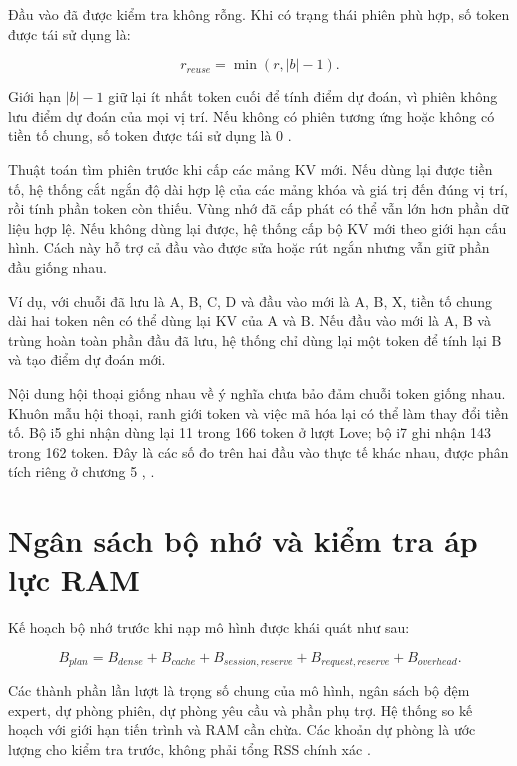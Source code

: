 Đầu vào đã được kiểm tra không rỗng. Khi có trạng thái phiên phù hợp, số token được tái sử dụng là:

\begin{equation}
\label{eq:4.2}
r_{reuse}=\min(r,|b|-1).
\end{equation}

Giới hạn $|b|-1$ giữ lại ít nhất token cuối để tính điểm dự đoán, vì phiên không lưu điểm dự đoán của mọi vị trí. Nếu không có phiên tương ứng hoặc không có tiền tố chung, số token được tái sử dụng là 0 \cite{moe_tierengine_arch}.

Thuật toán tìm phiên trước khi cấp các mảng KV mới. Nếu dùng lại được tiền tố, hệ thống cắt ngắn độ dài hợp lệ của các mảng khóa và giá trị đến đúng vị trí, rồi tính phần token còn thiếu. Vùng nhớ đã cấp phát có thể vẫn lớn hơn phần dữ liệu hợp lệ. Nếu không dùng lại được, hệ thống cấp bộ KV mới theo giới hạn cấu hình. Cách này hỗ trợ cả đầu vào được sửa hoặc rút ngắn nhưng vẫn giữ phần đầu giống nhau.

Ví dụ, với chuỗi đã lưu là A, B, C, D và đầu vào mới là A, B, X, tiền tố chung dài hai token nên có thể dùng lại KV của A và B. Nếu đầu vào mới là A, B và trùng hoàn toàn phần đầu đã lưu, hệ thống chỉ dùng lại một token để tính lại B và tạo điểm dự đoán mới.

Nội dung hội thoại giống nhau về ý nghĩa chưa bảo đảm chuỗi token giống nhau. Khuôn mẫu hội thoại, ranh giới token và việc mã hóa lại có thể làm thay đổi tiền tố. Bộ i5 ghi nhận dùng lại 11 trong 166 token ở lượt Love; bộ i7 ghi nhận 143 trong 162 token. Đây là các số đo trên hai đầu vào thực tế khác nhau, được phân tích riêng ở chương 5 \cite{exp_phase1_i5}, \cite{exp_phase1_i7}.

\section{Ngân sách bộ nhớ và kiểm tra áp lực RAM}

Kế hoạch bộ nhớ trước khi nạp mô hình được khái quát như sau:

\begin{equation}
\label{eq:4.3}
B_{plan}=B_{dense}+B_{cache}+B_{session,reserve}+B_{request,reserve}+B_{overhead}.
\end{equation}

Các thành phần lần lượt là trọng số chung của mô hình, ngân sách bộ đệm expert, dự phòng phiên, dự phòng yêu cầu và phần phụ trợ. Hệ thống so kế hoạch với giới hạn tiến trình và RAM cần chừa. Các khoản dự phòng là ước lượng cho kiểm tra trước, không phải tổng RSS chính xác \cite{moe_tierengine_arch}.

